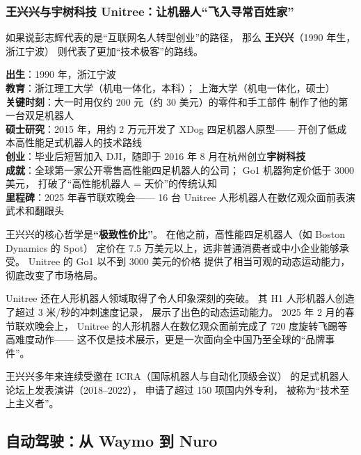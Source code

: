 \subsubsection{王兴兴与宇树科技 Unitree：让机器人``飞入寻常百姓家''}

如果说彭志辉代表的是``互联网名人转型创业''的路径，
那么 \textbf{王兴兴}（1990 年生，浙江宁波）
则代表了更加``技术极客''的路线。

\begin{corebox}
\textbf{出生}：1990 年，浙江宁波\\
\textbf{教育}：浙江理工大学（机电一体化，本科）；
上海大学（机电一体化，硕士）\\
\textbf{关键时刻}：大一时用仅约 200 元（约 30 美元）的零件和手工部件
制作了他的第一台双足机器人\\
\textbf{硕士研究}：2015 年，用约 2 万元开发了 XDog 四足机器人原型——
开创了低成本高性能足式机器人的技术路线\\
\textbf{创业}：毕业后短暂加入 DJI，随即于 2016 年 8 月在杭州创立\textbf{宇树科技}\\
\textbf{成就}：全球第一家公开零售高性能四足机器人的公司；
Go1 机器狗定价低于 3000 美元，
打破了``高性能机器人 = 天价''的传统认知\\
\textbf{里程碑}：2025 年春节联欢晚会——
16 台 Unitree 人形机器人在数亿观众面前表演武术和翻跟头
\end{corebox}

王兴兴的核心哲学是\textbf{``极致性价比''}。
在他之前，高性能四足机器人（如 Boston Dynamics 的 Spot）
定价在 7.5 万美元以上，远非普通消费者或中小企业能够承受。
Unitree 的 Go1 以不到 3000 美元的价格
提供了相当可观的动态运动能力，
彻底改变了市场格局。

Unitree 还在人形机器人领域取得了令人印象深刻的突破。
其 H1 人形机器人创造了超过 3 米/秒的冲刺速度记录，
展示了出色的动态运动能力。
2025 年 2 月的春节联欢晚会上，
Unitree 的人形机器人在数亿观众面前完成了
720 度旋转飞踢等高难度动作——
这不仅是技术展示，更是一次面向全中国乃至全球的``品牌事件''。

王兴兴多年来连续受邀在 ICRA（国际机器人与自动化顶级会议）
的足式机器人论坛上发表演讲（2018--2022），
申请了超过 150 项国内外专利，
被称为``技术至上主义者''。


\subsection{自动驾驶：从 Waymo 到 Nuro}
\label{subsec:autonomous-driving}

